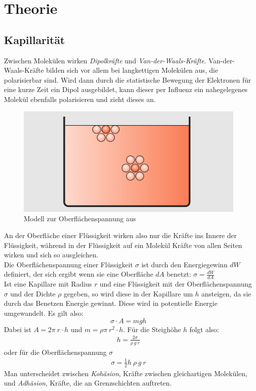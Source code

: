 \documentclass[12pt,a4paper,titlepage,headinclude,bibtotoc]{scrartcl}
\begin{document}
\section{Theorie}
\label{sec:theorie}
\subsection{Kapillarität}
Zwischen Molekülen wirken \textit{Dipolkräfte} und \textit{Van-der-Waals-Kräfte}.
Van-der-Waals-Kräfte bilden sich vor allem bei langkettigen Molekülen aus, die polarisierbar sind.
Wird dann durch die statistische Bewegung der Elektronen für eine kurze Zeit ein Dipol ausgebildet, kann dieser per Influenz ein nahegelegenes Molekül ebenfalls polarisieren und zieht dieses an.
\begin{figure}[!h]
 \centering
 \includegraphics[width=0.5\linewidth]{Oberflaechenspannung.png}
 \caption{Modell zur Oberflächenspannung aus \cite[S. 198]{gerthsen} }
\end{figure}
An der Oberfläche einer Flüssigkeit wirken also nur die Kräfte ins Innere der Flüssigkeit, während in der Flüssigkeit auf ein Molekül Kräfte von allen Seiten wirken und sich so ausgleichen.\\
Die Oberflächenspannung einer Flüssigkeit $\sigma$ ist durch den Energiegewinn $dW$ definiert, der sich ergibt wenn sie eine Oberfläche $dA$ benetzt: $ \sigma=\frac{dW}{dA}$\\
Ist eine Kapillare mit Radius $r$ und eine Flüssigkeit mit der Oberflächenspannung $\sigma$ und der Dichte $\rho$ gegeben, so wird diese in der Kapillare um $h$ ansteigen, da sie durch das Benetzen Energie gewinnt.
Diese wird in potentielle Energie umgewandelt.
Es gilt also:
$$ \sigma\cdot A=mgh$$
Dabei ist $A=2\pi~r \cdot h$ und $m=\rho \pi ~ r^2 \cdot h$.
Für die Steighöhe $h$ folgt also:
\begin{align}
	h = \frac{2\sigma}{\rho~g~r}
\end{align}
oder für die Oberflächenspannung $\sigma$
\begin{align}
 \sigma =\frac{1}{2}h~\rho~g~r \label{eq:oberfl}
\end{align}
Man unterscheidet zwischen \textit{Kohäsion}, Kräfte zwischen gleichartigen Molekülen, und \textit{Adhäsion}, Kräfte, die an Grenzschichten auftreten.\\
\end{document}
